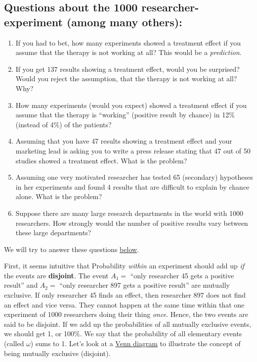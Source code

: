 \documentclass[
]{book}
\providecommand{\tightlist}{%
  \setlength{\itemsep}{0pt}\setlength{\parskip}{0pt}}
\begin{document}
\subsection{Questions about the 1000 researcher-experiment (among many others):}\label{Questions_about_the_1000-researcher_experiment}

\begin{enumerate}
\def\labelenumi{\arabic{enumi}.}
\tightlist
\item
  If you had to bet, how many experiments showed a treatment effect if you assume that the therapy is not
  working at all? This would be a \emph{prediction}.
\item
  If you get 137 results showing a treatment effect, would you be surprised? Would you reject the assumption, that the therapy is not working at all? Why?
\item
  How many experiments (would you expect) showed a treatment effect if you assume that the therapy is ``working'' (positive result by chance) in 12\% (instead of 4\%) of the patients?
\item
  Assuming that you have 47 results showing a treatment effect and your marketing lead is asking you to write a press release stating that 47
  out of 50 studies showed a treatment effect. What is the problem?
\item
  Assuming one very motivated researcher has tested 65 (secondary) hypotheses in her experiments and found 4 results that are difficult to explain by chance alone. What is the problem?
\item
  Suppose there are many large research departments in the world with 1000 researchers. How strongly would the number of positive results vary between these large departments?
\end{enumerate}

We will try to answer these questions \hyperref[Answers_Questions_about_the_1000-researcher_experiment]{below}.

First, it seems intuitive that Probability \emph{within} an experiment should add up \emph{if} the events are \textbf{disjoint}.
The event \(A_1=\) ``only researcher 45 gets a positive result'' and \(A_2=\) ``only researcher 897 gets a positive result'' are mutually exclusive.
If only researcher 45 finds an effect, then researcher 897 does not find an effect and vice versa. They cannot happen at the same time within that one
experiment of 1000 researchers doing their thing \emph{once}. Hence, the two events are said to be disjoint.
If we add up the probabilities of all mutually exclusive events, we should get 1, or 100\%.
We say that the probability of all elementary events (called \(\omega\)) sums to 1. Let's look at a \href{https://en.wikipedia.org/wiki/Venn_diagram}{Venn diagram} to illustrate the concept of being mutually exclusive (disjoint).
\end{document}
